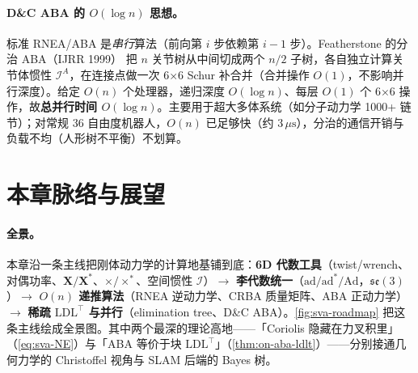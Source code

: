 \paragraph{D\&C ABA 的 $O(\log n)$ 思想。}
标准 RNEA/ABA 是\emph{串行}算法（前向第 $i$ 步依赖第 $i-1$ 步）。Featherstone 的分治 ABA（IJRR 1999）\cite{featherstone1999divide} 把 $n$ 关节树从中间切成两个 $n/2$ 子树，各自独立计算关节体惯性 $\mathcal I^A$，在连接点做一次 6×6 Schur 补合并（合并操作 $O(1)$，不影响并行深度）。给定 $O(n)$ 个处理器，递归深度 $O(\log n)$、每层 $O(1)$ 个 6×6 操作，故\textbf{总并行时间 $O(\log n)$}。主要用于超大多体系统（如分子动力学 1000+ 链节）；对常规 36 自由度机器人，$O(n)$ 已足够快（约 3$\,\mu\mathrm s$），分治的通信开销与负载不均（人形树不平衡）不划算。

\section{本章脉络与展望}
\label{sec:on-outlook}

\paragraph{全景。}
本章沿一条主线把刚体动力学的计算地基铺到底：\textbf{6D 代数工具}（twist/wrench、对偶功率、$\mathbf X/\mathbf X^*$、$\times/\times^*$、空间惯性 $\mathcal I$）$\to$ \textbf{李代数统一}（$\mathrm{ad}/\mathrm{ad}^*/\mathrm{Ad}$，$\mathfrak{se}(3)$）$\to$ \textbf{$O(n)$ 递推算法}（RNEA 逆动力学、CRBA 质量矩阵、ABA 正动力学）$\to$ \textbf{稀疏 $\mathrm{LDL}^\top$ 与并行}（elimination tree、D\&C ABA）。\cref{fig:sva-roadmap} 把这条主线绘成全景图。其中两个最深的理论高地——「Coriolis 隐藏在力叉积里」（\cref{eq:sva-NE}）与「ABA 等价于块 $\mathrm{LDL}^\top$」（\cref{thm:on-aba-ldlt}）——分别接通几何力学的 Christoffel 视角与 SLAM 后端的 Bayes 树。

